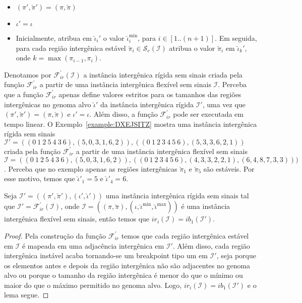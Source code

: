 \begin{itemize}
  \item $(\pi',\breve\pi') = (\pi,\breve\pi)$
  \item $\iota' = \iota$
  \item Inicialmente, atribua em $\breve\iota_{i}'$ o valor $\breve\iota^{\min}_i$, para $i \in [1..({n+1})]$. Em seguida, para cada região intergênica estável $\breve\pi_i \in \mathcal{S}_{e}(\mathcal{I})$ atribua o valor $\breve\pi_i$ em $\breve\iota_{k}'$, onde $k = \max(\pi_{i-1},\pi_i)$.
\end{itemize}

Denotamos por $\mathcal{F}_{ir}^{'}(\mathcal{I})$ a instância intergênica rígida sem sinais criada pela função $\mathcal{F}_{ir}^{'}$ a partir de uma instância intergênica flexível sem sinais $\mathcal{I}$. Perceba que a função $\mathcal{F}_{ir}^{'}$ apenas define valores estritos para os tamanhos das regiões intergênicas no genoma alvo $\breve\iota'$ da instância intergênica rígida $\mathcal{I'}$, uma vez que $(\pi',\breve\pi') = (\pi,\breve\pi)$ e $\iota' = \iota$. Além disso, a função $\mathcal{F}_{ir}^{'}$ pode ser executada em tempo linear. O Exemplo~\ref{example:DXEJSITZ} mostra uma instância intergênica rígida sem sinais $\mathcal{I}' = ((0~1~2~5~4~3~6),(5,0,3,1,6,2)),((0~1~2~3~4~5~6),(5,3,3,6,2,1))$ criada pela função $\mathcal{F}_{ir}^{'}$ a partir de uma instância intergênica flexível sem sinais $\mathcal{I}=((0~1~2~5~4~3~6),(5,0,3,1,6,2)),((0~1~2~3~4~5~6),(4,3,3,2,2,1),(6,4,8,7,3,3)))$. Perceba que no exemplo apenas as regiões intergênicas $\breve\pi_1$ e $\breve\pi_5$ são estáveis. Por esse motivo, temos que $\breve\iota'_1 = 5$ e $\breve\iota'_4 = 6$.



\begin{lemma}\label{lemma:UFTVNRSX}
Seja $\mathcal{I'} = ((\pi',\breve\pi'),(\iota',\breve\iota'))$ uma instância intergênica rígida sem sinais tal que $\mathcal{I'} = \mathcal{F}_{ir}^{'}(\mathcal{I})$, onde $\mathcal{I} = ((\pi,\breve\pi),(\iota,\breve\iota^{\min},\breve\iota^{\max}))$ é uma instância intergênica flexível sem sinais, então temos que $ir_i(\mathcal{I}) = ib_1(\mathcal{I'})$.
\end{lemma}
\begin{proof}
Pela construção da função $\mathcal{F}_{ir}^{'}$ temos que cada região intergênica estável em $\mathcal{I}$ é mapeada em uma adjacência intergênica em $\mathcal{I'}$. Além disso, cada região intergênica instável acaba tornando-se um breakpoint tipo um em $\mathcal{I'}$, seja porque os elementos antes e depois da região intergênica não são adjacentes no genoma alvo ou porque o tamanho da região intergênica é menor do que o mínimo ou maior do que o máximo permitido no genoma alvo. Logo, $ir_i(\mathcal{I}) = ib_1(\mathcal{I'})$ e o lema segue.
\end{proof}

